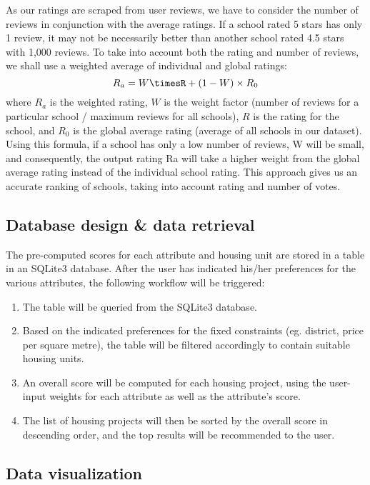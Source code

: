 \documentclass[a4paper, 11pt]{article}
\begin{document}
 As our ratings are scraped from user reviews, we have to consider the number of reviews in conjunction with the average ratings. If a school rated 5 stars has only 1 review, it may not be necessarily better than another school rated 4.5 stars with 1,000 reviews. To take into account both the rating and number of reviews, we shall use a weighted average of individual and global ratings: 
\[R_a = W\timesR +(1-W)\times R_0\] where $R_a$ is the weighted rating, $W$ is the weight factor (number of reviews for a particular school / maximum reviews for all schools), $R$ is the rating for the school, and $R_0$ is the global average rating (average of all schools in our dataset). Using this formula, if a school has only a low number of reviews, W will be small, and consequently, the output rating Ra will take a higher weight from the global average rating instead of the individual school rating. This approach gives us an accurate ranking of schools, taking into account rating and number of votes.

\subsection{Database design \& data retrieval}

The pre-computed scores for each attribute and housing unit are stored in a table in an SQLite3 database. After the user has indicated his/her preferences for the various attributes, the following workflow will be triggered:
\begin{enumerate}
    \item The table will be queried from the SQLite3 database.
    \item Based on the indicated preferences for the fixed constraints (eg. district, price per square metre), the table will be filtered accordingly to contain suitable housing units.
    \item An overall score will be computed for each housing project, using the user-input weights for each attribute as well as the attribute’s score.
    \item The list of housing projects will then be sorted by the overall score in descending order, and the top results will be recommended to the user.
\end{enumerate}

\subsection{Data visualization}
\end{document}
